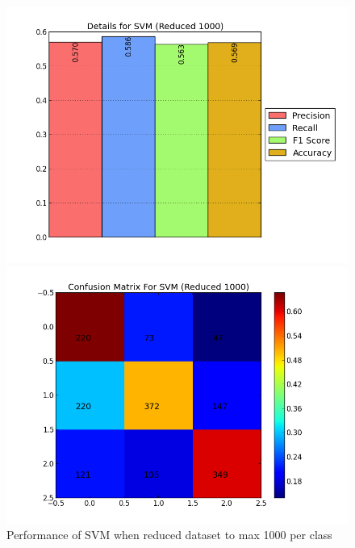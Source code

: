 \begin{figure}[htb]
	\centering
	\begin{minipage}{.45\linewidth}
		\includegraphics[width=\linewidth]{../img/plots/analysis/svm_stats_best_reduced_1000.png}
	\end{minipage}
	\hspace{0.05\linewidth}
	\begin{minipage}{.45\linewidth}
		\includegraphics[width=\linewidth]{../img/plots/analysis/svm_confusion_matrix_best_reduced_1000.png}
	\end{minipage}
	\label{fig:svm_reduced_1000}
	\caption[Performance of SVM when reduced dataset to max 1000 per class]{Performance of SVM when reduced dataset to max 1000 per class}
\end{figure}

